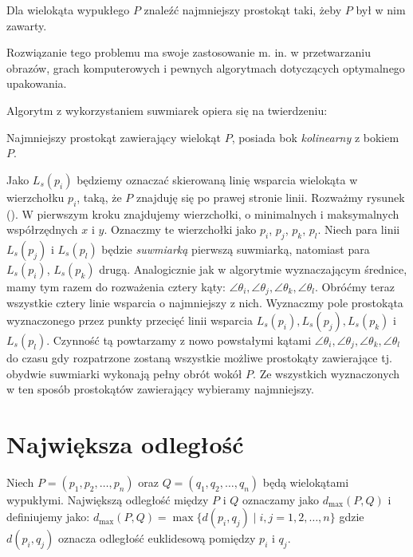 \begin{problem}
  Dla wielokąta wypukłego $P$ znaleźć najmniejszy prostokąt taki, żeby
  $P$ był w nim zawarty.
\end{problem}

Rozwiązanie tego problemu ma swoje zastosowanie m. in. w przetwarzaniu
obrazów, grach komputerowych i pewnych algorytmach dotyczących
optymalnego upakowania.

Algorytm z wykorzystaniem suwmiarek opiera się na twierdzeniu:

\begin{twierdzenie}
  Najmniejszy prostokąt zawierający wielokąt $P$, posiada bok
  \emph{kolinearny} z bokiem $P$.
\end{twierdzenie}

Jako $L_s(p_i)$ będziemy oznaczać skierowaną linię wsparcia wielokąta
w wierzchołku $p_i$, taką, że $P$ znajduję się po prawej stronie
linii. Rozważmy rysunek (). W pierwszym kroku znajdujemy wierzchołki,
o minimalnych i maksymalnych współrzędnych $x$ i $y$. Oznaczmy te
wierzchołki jako $p_i$, $p_j$, $p_k$, $p_l$. Niech para linii
$L_s(p_j)$ i $L_s(p_l)$ będzie \emph{suwmiarką} pierwszą suwmiarką,
natomiast para $L_s(p_i)$, $L_s(p_k)$ drugą. Analogicznie jak w
algorytmie wyznaczającym średnice, mamy tym razem do rozważenia cztery
kąty: $\angle{\theta_i}, \angle{\theta_j}, \angle{\theta_k},
\angle{\theta_l}$. Obróćmy teraz wszystkie cztery linie wsparcia o
najmniejszy z nich. Wyznaczmy pole prostokąta wyznaczonego przez
punkty przecięć linii wsparcia $L_s(p_i), L_s(p_j), L_s(p_k)$ i
$L_s(p_l)$. Czynność tą powtarzamy z nowo powstałymi kątami
$\angle{\theta_i}, \angle{\theta_j}, \angle{\theta_k},
\angle{\theta_l}$ do czasu gdy rozpatrzone zostaną wszystkie możliwe
prostokąty zawierające tj. obydwie suwmiarki wykonają pełny obrót
wokół $P$. Ze wszystkich wyznaczonych w ten sposób prostokątów
zawierający wybieramy najmniejszy.

\section{Największa odległość\label{sec:max_dist}}
\begin{problem}
  Niech $P = (p_1, p_2, \ldots, p_n)$ oraz $Q = (q_1, q_2, \ldots,
  q_n)$ będą wielokątami wypukłymi. Największą odległość między $P$ i
  $Q$ oznaczamy jako $d_{\max}(P, Q)$ i definiujemy jako: $d_{\max}(P,
  Q) = \max{\{ d(p_i, q_j) \mid i, j = 1, 2, \ldots, n \}}$ gdzie
  $d(p_i, q_j)$ oznacza odległość euklidesową pomiędzy $p_i$ i $q_j$.
\end{problem}

